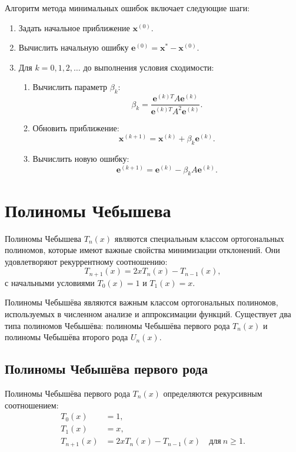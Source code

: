\documentclass{article}
\begin{document}
Алгоритм метода минимальных ошибок включает следующие шаги:
\begin{enumerate}
    \item Задать начальное приближение \(\mathbf{x}^{(0)}\).
    \item Вычислить начальную ошибку \(\mathbf{e}^{(0)} = \mathbf{x}^{*} - \mathbf{x}^{(0)}\).
    \item Для \(k = 0, 1, 2, \ldots\) до выполнения условия сходимости:
    \begin{enumerate}
        \item Вычислить параметр \(\beta_k\):
        \[
        \beta_k = \frac{\mathbf{e}^{(k)T} A \mathbf{e}^{(k)}}{\mathbf{e}^{(k)T} A^2 \mathbf{e}^{(k)}}.
        \]
        \item Обновить приближение:
        \[
        \mathbf{x}^{(k+1)} = \mathbf{x}^{(k)} + \beta_k \mathbf{e}^{(k)}.
        \]
        \item Вычислить новую ошибку:
        \[
        \mathbf{e}^{(k+1)} = \mathbf{e}^{(k)} - \beta_k A \mathbf{e}^{(k)}.
        \]
    \end{enumerate}
\end{enumerate}
\section{Полиномы Чебышева}
Полиномы Чебышева $T_n(x)$ являются специальным классом ортогональных полиномов, которые имеют важные свойства минимизации отклонений. Они удовлетворяют рекуррентному соотношению:
\[
T_{n+1}(x) = 2xT_n(x) - T_{n-1}(x),
\]
с начальными условиями $T_0(x) = 1$ и $T_1(x) = x$.

Полиномы Чебышёва являются важным классом ортогональных полиномов, используемых в численном анализе и аппроксимации функций. Существует два типа полиномов Чебышёва: полиномы Чебышёва первого рода \( T_n(x) \) и полиномы Чебышёва второго рода \( U_n(x) \).

\subsection*{Полиномы Чебышёва первого рода}

Полиномы Чебышёва первого рода \( T_n(x) \) определяются рекурсивным соотношением:
\begin{align*}
T_0(x) &= 1, \\
T_1(x) &= x, \\
T_{n+1}(x) &= 2x T_n(x) - T_{n-1}(x) \quad \text{для} \ n \geq 1.
\end{align*}
\end{document}
